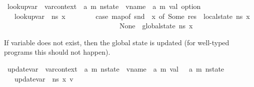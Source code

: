 \begin{isabellebody}
\endisatagproof
{\isafoldproof}%
%
\isadelimproof
\isanewline
%
\endisadelimproof
\isanewline
{}\isamarkupfalse%
\ lookup{\isacharunderscore}{\kern0pt}var\ {\isacharcolon}{\kern0pt}{\isacharcolon}{\kern0pt}\ {\isachardoublequoteopen}var{\isacharunderscore}{\kern0pt}context\ {\isasymRightarrow}\ {\isacharparenleft}{\kern0pt}{\isacharprime}{\kern0pt}a{\isacharcomma}{\kern0pt}\ {\isacharprime}{\kern0pt}m{\isacharparenright}{\kern0pt}\ nstate\ {\isasymRightarrow}\ vname\ {\isasymRightarrow}\ {\isacharparenleft}{\kern0pt}{\isacharprime}{\kern0pt}a{\isacharcomma}{\kern0pt}\ {\isacharprime}{\kern0pt}m{\isacharparenright}{\kern0pt}\ val\ option{\isachardoublequoteclose}\isanewline
\ \ \ \isanewline
\ \ \ {\isachardoublequoteopen}lookup{\isacharunderscore}{\kern0pt}var\ {\isasymLambda}\ ns\ x\ {\isacharequal}{\kern0pt}\ \isanewline
\ \ \ \ \ \ {\isacharparenleft}{\kern0pt}case\ {\isacharparenleft}{\kern0pt}map{\isacharunderscore}{\kern0pt}of\ {\isacharparenleft}{\kern0pt}snd\ {\isasymLambda}{\isacharparenright}{\kern0pt}\ x{\isacharparenright}{\kern0pt}\ of\ Some\ res\ {\isasymRightarrow}\ local{\isacharunderscore}{\kern0pt}state\ ns\ x\ {\isacharbar}{\kern0pt}\isanewline
\ \ \ \ \ \ \ \ \ \ \ \ \ \ \ \ \ \ \ \ \ \ \ \ \ \ \ \ \ \ \ \ \ None\ {\isasymRightarrow}\ global{\isacharunderscore}{\kern0pt}state\ ns\ x{\isacharparenright}{\kern0pt}{\isachardoublequoteclose}%
\begin{isamarkuptext}%
If variable does not exist, then the global state is updated (for well-typed programs this 
should not happen).%
\end{isamarkuptext}\isamarkuptrue%
\isamarkupfalse%
\ update{\isacharunderscore}{\kern0pt}var\ {\isacharcolon}{\kern0pt}{\isacharcolon}{\kern0pt}\ {\isachardoublequoteopen}var{\isacharunderscore}{\kern0pt}context\ {\isasymRightarrow}\ {\isacharparenleft}{\kern0pt}{\isacharprime}{\kern0pt}a{\isacharcomma}{\kern0pt}\ {\isacharprime}{\kern0pt}m{\isacharparenright}{\kern0pt}\ nstate\ {\isasymRightarrow}\ vname\ {\isasymRightarrow}\ {\isacharparenleft}{\kern0pt}{\isacharprime}{\kern0pt}a{\isacharcomma}{\kern0pt}\ {\isacharprime}{\kern0pt}m{\isacharparenright}{\kern0pt}\ val\ {\isasymRightarrow}\ \ {\isacharparenleft}{\kern0pt}{\isacharprime}{\kern0pt}a{\isacharcomma}{\kern0pt}\ {\isacharprime}{\kern0pt}m{\isacharparenright}{\kern0pt}\ nstate{\isachardoublequoteclose}\isanewline
\ \ \ \isanewline
\ \ \ {\isachardoublequoteopen}update{\isacharunderscore}{\kern0pt}var\ {\isasymLambda}\ n{\isacharunderscore}{\kern0pt}s\ x\ v\ {\isacharequal}{\kern0pt}\isanewline

\end{isabellebody}
